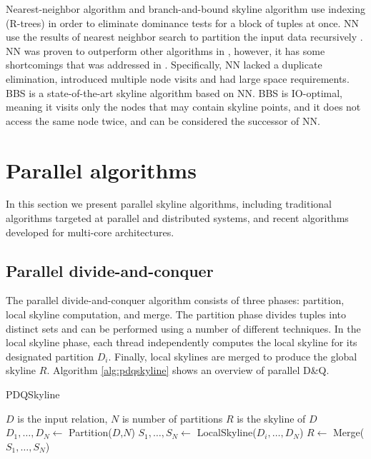 \documentclass[12pt,a4paper,twoside]{report}
\begin{document}
Nearest-neighbor algorithm and branch-and-bound skyline algorithm
use indexing (R-trees) in order to eliminate dominance tests for a
block of tuples at once. NN use the results of nearest neighbor
search to partition the input data recursively
\cite{borzsony2001skyline}. NN was proven to outperform other
algorithms in \cite{borzsony2001skyline}, however, it has some
shortcomings that was addressed in \cite{papadias2005progressive}.
Specifically, NN lacked a duplicate elimination, introduced
multiple node visits and had large space requirements. BBS is a
state-of-the-art skyline algorithm based on NN. BBS is IO-optimal,
meaning it visits only the nodes that may contain skyline points,
and it does not access the same node twice, and can be considered
the successor of NN.

\section{Parallel algorithms}

In this section we present parallel skyline algorithms, including
traditional algorithms targeted at parallel and distributed
systems, and recent algorithms developed for multi-core
architectures.

\subsection{Parallel divide-and-conquer}

The parallel divide-and-conquer algorithm consists of three
phases: partition, local skyline computation, and merge. The
partition phase divides tuples into distinct sets and can be
performed using a number of different techniques. In the local
skyline phase, each thread independently computes the local
skyline for its designated partition $D_i$. Finally, local
skylines are merged to produce the global skyline $R$. Algorithm
\ref{alg:pdqskyline} shows an overview of parallel D\&Q.

\begin{algorithm}[H]
	\caption{PDQSkyline}
	\label{alg:pdqskyline}
	\begin{algorithmic}
		\Require 
			$D$ is the input relation, 
			$N$ is number of partitions
		\Ensure $R$ is the skyline of $D$
		\State $D_1, \ldots, D_N \leftarrow$ Partition($D$,$N$)
		\State $S_1,\ldots,S_N \leftarrow$ LocalSkyline($D_i,\ldots,D_N$)
		\State $R \leftarrow$ Merge($S_1,\ldots,S_N$)
	\end{algorithmic}
\end{algorithm}
\end{document}
